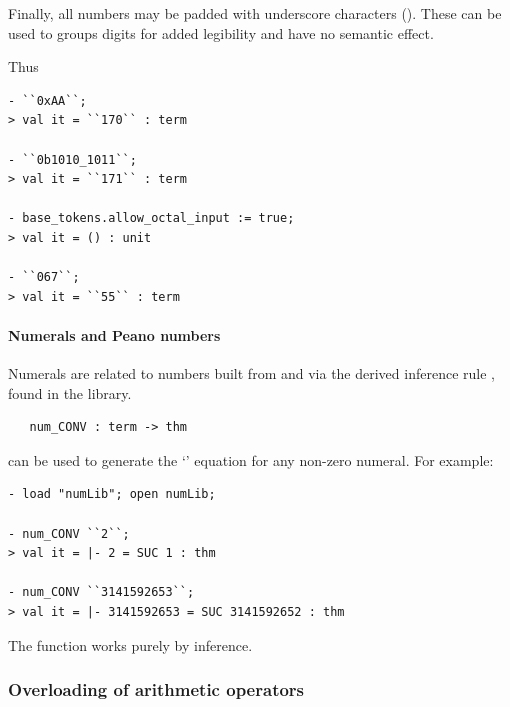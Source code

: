 Finally, all numbers may be padded with underscore characters
(\ml{\_}).  These can be used to groups digits for added legibility
and have no semantic effect.

Thus
\begin{session}
\begin{verbatim}
- ``0xAA``;
> val it = ``170`` : term

- ``0b1010_1011``;
> val it = ``171`` : term

- base_tokens.allow_octal_input := true;
> val it = () : unit

- ``067``;
> val it = ``55`` : term
\end{verbatim}
\end{session}

\paragraph{Numerals and Peano numbers}

Numerals are related to numbers built from  and 
via the derived inference rule , found in the
 library.

\begin{holboxed}
\begin{verbatim}
   num_CONV : term -> thm
\end{verbatim}
\end{holboxed}

\noindent {} can be used to generate the `'
equation for any non-zero numeral.  For example:

\begin{session}
\begin{verbatim}
- load "numLib"; open numLib;

- num_CONV ``2``;
> val it = |- 2 = SUC 1 : thm

- num_CONV ``3141592653``;
> val it = |- 3141592653 = SUC 3141592652 : thm
\end{verbatim}
\end{session}

\noindent The  function works purely by inference.

\subsubsection{Overloading of arithmetic operators}
\label{arith-overloading}

